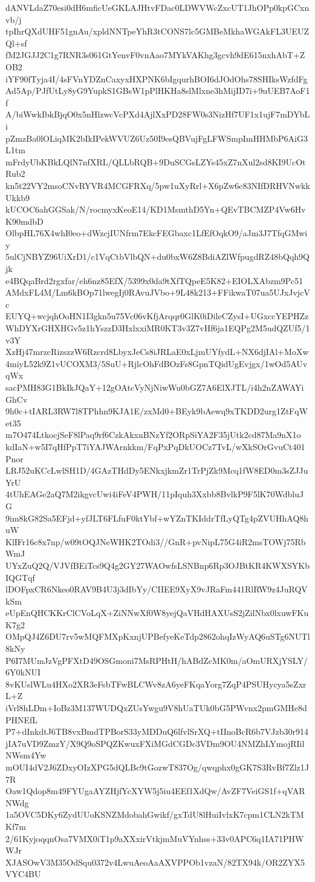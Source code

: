 dANVLdaZ70esi0dH6mficUeGKLAJHtvFDac0LDWVWcZxcUT1JhOPp0kpGCxnvb/j
tpIhrQXdUHF51gnAu/xpldNNTpeYhR3tCONS7lc5GMBeMkhaWGAkFL3UEUZQl+sf
fM2JGJJ2C1g7RNR3s061GtYenvF0vnAao7MYkVAKhg3gcvh9dE615nxhAbT+ZOB2
iYF90fTyja4I/4sFVnYDZnCaxyxHXPNK6bIgqurhBOI6dJOdOhs78SHIksWzfdFg
Ad5Ap/PJfUtLy8yG9YupkS1GBsW1pPlHKHa8slMlxne3hMijID7i+9uUEB7AoF1f
A/biWwkIbkBjqO0x5nHlzwcVcPXd4AjlXxPD28FW0s3NizHf7UF1x1ujF7mDYbLi
pZmzBa0lOLiqMK2bIkIPekWVUZ6Uz50I9esQBVujFgLFWSmpImHHMbP6AiG3L1tm
mFrdyUbKBkLQlN7nfXRL/QLLbRQB+9DuSCGsLZYs45xZ7nXul2sd8KI9UcOtRub2
kn5t22VY2msoCNvRYVR4MCGFRXq/5pw1uXyRrl+X6pZw6c83NIfDRHVNwkkUkkb9
kUCOC6ahGGSak/N/rocmyxKeoE14/KD1MsmthD5Yn+QEvTBCMZP4Vw6HvK90mdbD
OlbpHL76X4whI0eo+dWzcjIUNfrm7EkcFEGbaxc1LfEfOqkO9/aJm3J7TfqGMwiy
5ulCjNBYZ96UiXrD1/c1VqCtbVlbQN+du0bxW6Z8BdiAZlWfpugdRZ48bQqh9Qjk
e4BQqaBrd2rgxfar/eh6nz85EfX/5399x0da9tXfTQpeE5K82+EIOLXAbzm9Pc51
AMdxFL4M/Lm6kBOp71lwegIj0RAvuJVbo+9L48k213+FFikwaT07ua5UJxJvjcVc
EUYQ+wcjqhOoHN1I3gkn5u75Vc06vKfjArqqr0GlK0iDileCZysI+UGxccYEPHZz
WhDYXrGHXHGv5z1hYszzD3HxlxxiMR0KT3v3Z7vHf6ja1EQPg2M5udQZUf5/1v3Y
XzHj47mrzcRizszzW6Rzcrd8LbyxJeCs8iJRLaE0xLjmUYfydL+NX6djIAl+MoXw
4miyL52k9Z1vUCOXM3/5SuU+RjlcOhFdBOzFs8GpnTQidUgEvjgx/1wOd5AUvqWx
sacPMH83G1BkIkJQaY+12gOAtcVyNjNiwWu0bGZ7A6ElXJTL/i4h2nZAWAYiGhCv
9h0c+tIARL3RW7l8TPhhn9KJA1E/zxMd0+BEyk9bAewq9xTKDD2urg1ZtFqWet35
m7O474LtkocjSeF8lPaq9rf6CzkAkxnBNzYf2ORpSiYA2F35jUtk2cd87Ma9nX1o
kdIaN+w5I7qHfPpT7iYAJWArnkkm/FqPxPqDkUOCz7TvL/wXkSOrGvuCt401Pnor
LRJ52uKCcLwlSH1D/4GAzTHdDy5ENkxjkmZr1TrPjZk9Mcq1fW8ED0m3sZJJuYrU
4tUhEAGe2aQ7M2ikgvcUwi4iFeV4PWH/11pIquh3Xxbb8BvlkP9F5lK70WdbluJG
9im8kG82Sa5EFjd+yfJLT6FLfuF0ktYbf+wYZnTKIddrTfLyQTg4pZVUHhAQ8huW
KlIFr16c8x7np/w09tOQJNeWHK2TOdi3//GnR+pvNipL75G4iR2msTOWj75RbWmJ
UYxZuQ2Q/VJVfBEiTcs9Q4g2GY27WAOwfsLSNBnp6Rp3OJBtKR4KWXSYKbIQGTqf
lDOFpxCR6Nkeo0RAV9B4U3j3dIbYy/CIIEE9XyX9vJRaFm441RlRW9z4JuRQVkSm
eUpEnQHCKKrClCVoLqX+ZiNNwXf0W8yejQaVHdHAXUsS2jZilNbx0lxuwFKuK7g2
OMpQJ4Z6DU7rv5wMQFMXpKxnjUPBefyeKeTdp2862ohqIzWyAQ6uSTg6NUTl8kNy
P6I7MUmJzVgPFXtD49OSGmoni7MsRPHtH/hABdZcMK0m/aOmURXjYSLY/6Y0kNUI
8vKUslWLu4HXo2XR3eFsbTFwBLCWv8zA6yeFKqaYorg7ZqP4PSUHycya5sZxrL+Z
iVrl8hLDm+IoBz3M137WUDQxZUsYwgu9V8hUaTUk0bG5PWvnx2pmGMHe8dPHNEfL
P7+dInkdtJ6TB8vxBmdTPBorS33yMDDuQ6lfvlSrXQ+tIInoBcR6b7VJzb30r914
jIA7uVD9ZmzY/X9Q9oSPQZKwuxFXiMGdCGDc3VDm9OU4NMZhLYmojRIilNWsm4Yw
mOUI4dV2J6ZDxyOIzXPG5dQLBc9tGozwT837Og/qwqphx0gGK7S3RvBf7Zlz1J7R
Oaw1Qdop8m49FYUgaAYZHjfYcXYW5j5iu4EEf1XdQw/AvZF7VeiGS1f+qVARNWdg
1a5OVC5DKy6ZydUUoKSNZMdobahGwikf/gxTdU8lHuiIvlxK7cpm1CLN2kTMKf7m
2/61KyjoqqnOsa7VMX0iT1p9aXXxirVtkjmMuVYnhss+33v0APC6q1IA71PHWWJr
XJASOwV3M35OdSqu0372v4LwuAeoAaAXVPPOb1vzaN/82TX94k/OR2ZYX5VYC4BU

